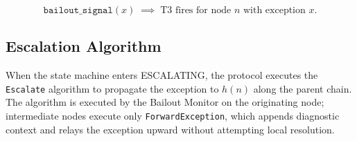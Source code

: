 \begin{equation}
\texttt{bailout\_signal}(x) \;\implies\; \text{T3 fires for node } n \text{ with exception } x. \tag{TC-secondary}\label{eq:tc-secondary}
\end{equation}

\subsection{Escalation Algorithm}\label{sec:escalation-algorithm}

When the state machine enters ESCALATING, the protocol executes the \texttt{Escalate} algorithm to propagate the exception to $h(n)$ along the parent chain. The algorithm is executed by the Bailout Monitor on the originating node; intermediate nodes execute only \texttt{ForwardException}, which appends diagnostic context and relays the exception upward without attempting local resolution.

